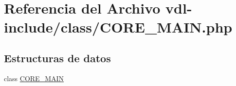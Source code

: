 \hypertarget{CORE__MAIN_8php}{\section{Referencia del Archivo vdl-\/include/class/\-C\-O\-R\-E\-\_\-\-M\-A\-I\-N.php}
\label{CORE__MAIN_8php}
}
\subsection*{Estructuras de datos}
\begin{DoxyCompactItemize}
\item 
class \hyperlink{classCORE__MAIN}{C\-O\-R\-E\-\_\-\-M\-A\-I\-N}
\end{DoxyCompactItemize}
